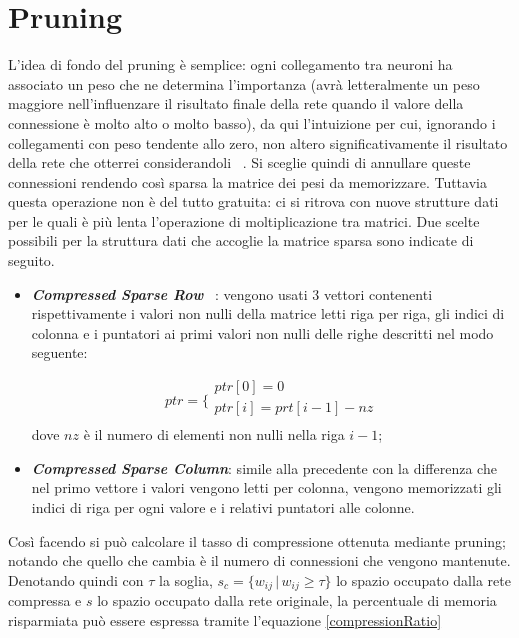 \documentclass[12pt]{report}
\begin{document}
\section{Pruning}

L’idea di fondo del pruning è semplice: ogni collegamento tra neuroni ha associato un peso che ne determina l’importanza (avrà letteralmente un peso maggiore nell’influenzare il risultato finale della rete quando il valore della connessione è molto alto o molto basso), da qui l’intuizione per cui, ignorando i collegamenti con peso tendente allo zero, non altero significativamente il risultato della rete che otterrei considerandoli ~\cite{Pruning}.
Si sceglie quindi di annullare queste connessioni rendendo così sparsa la matrice dei pesi da memorizzare. Tuttavia questa operazione non è del tutto gratuita: ci si ritrova con nuove strutture dati per le quali è più lenta l'operazione di moltiplicazione tra matrici. Due scelte possibili per la struttura dati che accoglie la matrice sparsa sono indicate di seguito.
\begin{itemize}
\item{\textbf{\textit{Compressed Sparse Row}}} ~\cite{CSC}: vengono usati 3 vettori contenenti rispettivamente i valori non nulli della matrice letti riga per riga, gli indici di colonna e i puntatori ai primi valori non nulli delle righe descritti nel modo seguente: 

$$ptr =
\bigg \{
\begin{array}{ll}
ptr[0] = 0 \\
ptr[i] = prt[i - 1] - nz \\
\end{array}
$$
dove $nz$ è il numero di elementi non nulli nella riga $i - 1$;

\item{\textbf{\textit{Compressed Sparse Column}}}: simile alla precedente con la differenza che nel primo vettore i valori vengono letti per colonna, vengono memorizzati gli indici di riga per ogni valore e i relativi puntatori alle colonne.
\end{itemize}

Così facendo si può calcolare il tasso di compressione ottenuta mediante pruning; notando che quello che cambia è il numero di connessioni che vengono mantenute. Denotando quindi con $\tau$ la soglia, $s_c = \lbrace w_{ij} \,|\, w_{ij} \geq \tau \rbrace$ lo spazio occupato dalla rete compressa e $s$ lo spazio occupato dalla rete originale, la percentuale di memoria risparmiata può essere espressa tramite l'equazione \eqref{compressionRatio}
\end{document}
